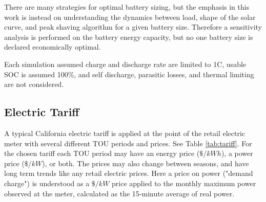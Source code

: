 \documentclass[
]{article}
\begin{document}
There are many strategies for optimal battery sizing, but the emphasis
in this work is instead on understanding the dynamics between load,
shape of the solar curve, and peak shaving algorithm for a given battery
size. Therefore a sensitivity analysis is performed on the battery
energy capacity, but no one battery size is declared economically
optimal.

Each simulation assumed charge and discharge rate are limited to 1C,
usable SOC is assumed 100\%, and self discharge, parasitic losses, and
thermal limiting are not considered.

\hypertarget{electric-tariff}{%
  \subsection{Electric Tariff}\label{electric-tariff}}

A typical California electric tariff is applied at the point of the
retail electric meter with several different TOU periods and prices. See Table \ref{tab:tariff}.
For the chosen tariff each TOU period may have an energy price
(\(\$/kWh\)), a power price (\(\$/kW\)), or both. The prices may also
change between seasons, and have long term trends like any retail
electric prices. Here a price on power ("demand charge") is understood
as a \(\$/kW\) price applied to the monthly maximum power observed at
the meter, calculated as the 15-minute average of real power.
\end{document}
